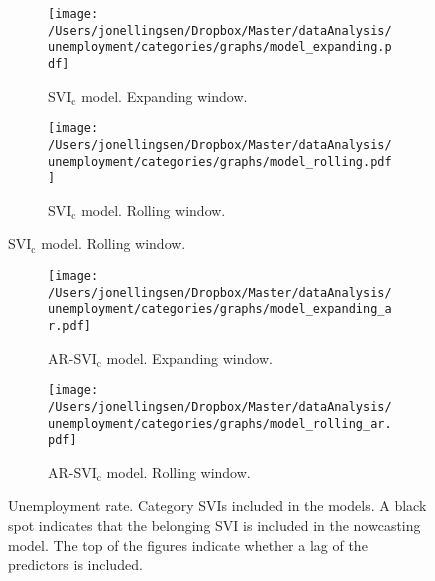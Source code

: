 \begin{figure}[ht]
\centering
    \begin{subfigure}[b]{\textwidth}
\caption{SVI$_{\text{c}}$ model. Expanding window.}
        \texttt{[image: /Users/jonellingsen/Dropbox/Master/dataAnalysis/unemployment/categories/graphs/model\_expanding.pdf]}
    \end{subfigure}
    \begin{subfigure}[b]{\textwidth}
\caption{SVI$_{\text{c}}$ model. Rolling window.}
        \texttt{[image: /Users/jonellingsen/Dropbox/Master/dataAnalysis/unemployment/categories/graphs/model\_rolling.pdf]}
    \end{subfigure}
\end{figure}
\begin{figure}\ContinuedFloat
\begin{subfigure}[b]{\textwidth}
 \caption{AR-SVI$_{\text{c}}$ model. Expanding window.}        
\texttt{[image: /Users/jonellingsen/Dropbox/Master/dataAnalysis/unemployment/categories/graphs/model\_expanding\_ar.pdf]}
    \end{subfigure}
\begin{subfigure}[b]{\textwidth}
\caption{AR-SVI$_{\text{c}}$ model. Rolling window.}        
\texttt{[image: /Users/jonellingsen/Dropbox/Master/dataAnalysis/unemployment/categories/graphs/model\_rolling\_ar.pdf]}
    \end{subfigure}
\caption{Unemployment rate. Category SVIs included in the models. A black spot indicates that the belonging SVI is included in the nowcasting model. The top of the figures indicate whether a lag of the predictors is included.}
\label{model_cat_urate}
\end{figure}

